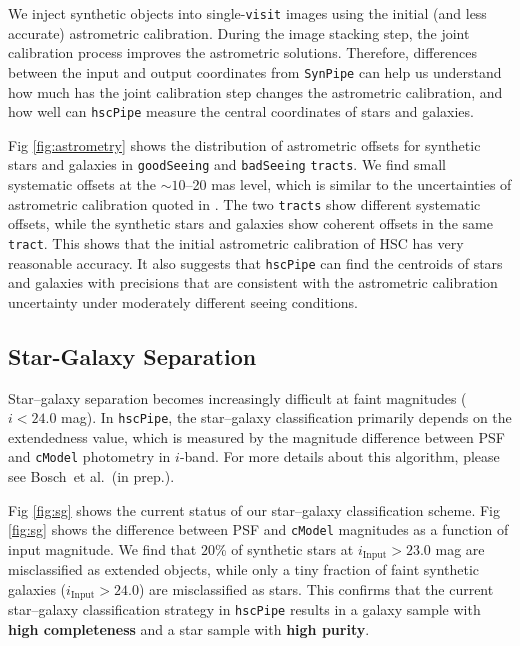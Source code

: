 \documentclass[useamsfonts]{pasj01}
\def\etal{{\ et al.~}}
\def\hscpipe{\texttt{hscPipe}}
\def\synpipe{\texttt{SynPipe}}
\def\cmodel{\texttt{cModel}}
\def\tract{\texttt{tract}}
\def\visit{\texttt{visit}}
\def\tracts{\texttt{tracts}}
\begin{document}
    We inject synthetic objects into single-\visit{} images using the initial (and 
    less accurate) astrometric calibration.
    During the image stacking step, the joint calibration process improves the
    astrometric solutions.
    Therefore, differences between the input and output coordinates from \synpipe{}
    can help us understand how much has the joint calibration step changes the 
    astrometric calibration, and how well can \hscpipe{} measure the central 
    coordinates of stars and galaxies. 

    Fig \ref{fig:astrometry} shows the distribution of astrometric offsets for 
    synthetic stars and galaxies in \texttt{goodSeeing} and \texttt{badSeeing} 
    \tracts{}.
    We find small systematic offsets at the ${\sim}10$--20 mas level, which is similar 
    to the uncertainties of astrometric calibration quoted in \citet{HSCDR1}.
    The two \tracts{} show different systematic offsets, while the synthetic stars and
    galaxies show coherent offsets in the same \tract{}.
    This shows that the initial astrometric calibration of HSC has very reasonable 
    accuracy.  
    It also suggests that \hscpipe{} can find the centroids of stars and galaxies 
    with precisions that are consistent with the astrometric calibration uncertainty
    under moderately different seeing conditions. 
    
\subsection{Star-Galaxy Separation}
    \label{ssec:sg}

    Star--galaxy separation becomes increasingly difficult at faint magnitudes 
    ($i<24.0$ mag).
    In \hscpipe{}, the star--galaxy classification primarily depends on the 
    extendedness value, which is measured by the magnitude difference between PSF and 
    \cmodel{} photometry in $i$-band.
    For more details about this algorithm, please see Bosch\etal (in prep.).

    Fig \ref{fig:sg} shows the current status of our star--galaxy classification 
    scheme.  
    Fig \ref{fig:sg} shows the difference between PSF and \cmodel{} magnitudes as a 
    function of input magnitude. 
    We find that $20$\% of synthetic stars at $i_{\mathrm{Input}}>23.0$ mag are 
    misclassified as extended objects, while only a tiny fraction of faint synthetic 
    galaxies ($i_{\mathrm{Input}}>24.0$) are misclassified as stars. 
    This confirms that the current star--galaxy classification strategy in \hscpipe{}
    results in a galaxy sample with \textbf{high completeness} and a star sample
    with \textbf{high purity}.
\end{document}
